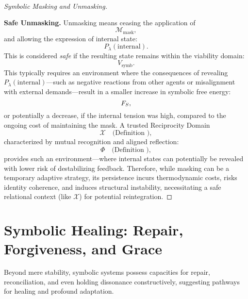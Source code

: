 \begin{proof}[Symbolic Masking and Unmasking]
\begin{itemize}
\end{itemize}
\textbf{Safe Unmasking.}  
Unmasking means ceasing the application of  
\[
\mathcal{M}_{\text{mask}},
\]
and allowing the expression of internal state:
\[
P_\lambda(\text{internal}).
\]
This is considered \emph{safe} if the resulting state remains within the viability domain:
\[
V_{\text{symb}}.
\]
This typically requires an environment where the consequences of revealing  
\( P_\lambda(\text{internal}) \)—such as negative reactions from other agents  
or misalignment with external demands—result in a smaller increase in symbolic free energy:
\[
F_S,
\]
or potentially a decrease, if the internal tension was high,  
compared to the ongoing cost of maintaining the mask.
A trusted Reciprocity Domain
\[
\mathcal{X} \quad \text{(Definition~)},
\]
characterized by mutual recognition and aligned reflection:
\[
\Phi \quad \text{(Definition~)},
\]
provides such an environment—where internal states can potentially be revealed  
with lower risk of destabilizing feedback.
Therefore, while masking can be a temporary adaptive strategy, its persistence incurs thermodynamic costs, risks identity coherence, and induces structural instability, necessitating a safe relational context (like $\mathcal{X}$) for potential reintegration.
\end{proof}
\section{Symbolic Healing: Repair, Forgiveness, and Grace}
\label{sec:bk9_symbolic_healing}
Beyond mere stability, symbolic systems possess capacities for repair, reconciliation, and even holding dissonance constructively, suggesting pathways for healing and profound adaptation. 
